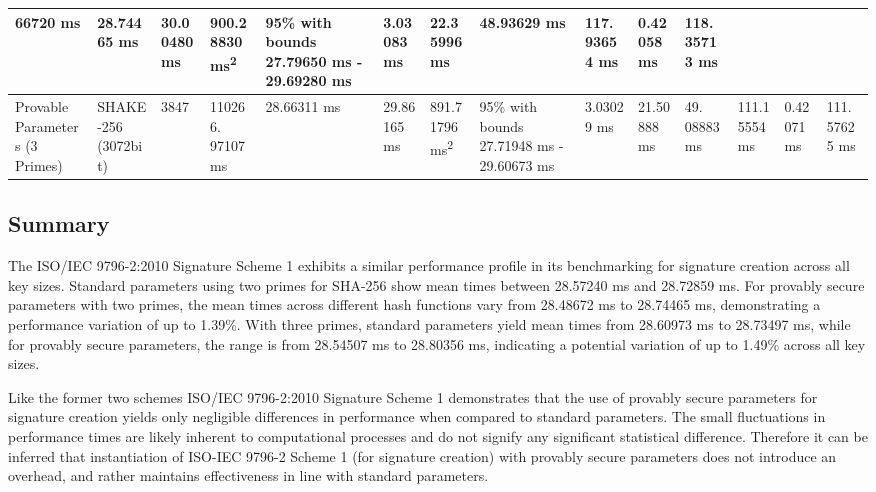 \documentclass[]{final_report}
\theoremstyle{definition}
\begin{document}
\begin{landscape}
\begin{longtable}{|p{2.3cm}|p{1.8cm}|p{1.0cm}|p{1.7cm}|p{1.4cm}|p{1.5cm}|p{1.8cm}|p{1.5cm}|p{1.2cm}|p{1.5cm}|p{1.3cm}|p{1.2cm}|p{1.3cm}|p{1.3cm}|}
66720 ms & 28.74465 ms & 30.00480 ms & 900.28830 ms\textsuperscript{2} & 95\% with bounds 27.79650 ms - 29.69280 ms & 3.03083 ms & 22.35996 ms & 48.93629 ms & 117.
93654 ms & 0.42058 ms & 118.
35713 ms  \\
\hline
Provable Parameters (3 Primes) & SHAKE-256 (3072bit) & 3847 & 110266.
97107 ms & 28.66311 ms & 29.86165 ms & 891.71796 ms\textsuperscript{2} & 95\% with bounds 27.71948 ms - 29.60673 ms & 3.03029 ms & 21.50888 ms & 49.
08883 ms & 111.15554 ms & 0.42071 ms & 111.
57625 ms  \\
\hline


\end{longtable}


\end{landscape}

\subsection*{Summary}

The ISO/IEC 9796-2:2010 Signature Scheme 1 exhibits a similar performance profile in its benchmarking for signature creation across all key sizes. Standard parameters using two primes for SHA-256 show mean times between 28.57240 ms and 28.72859 ms. For provably secure parameters with two primes, the mean times across different hash functions vary from 28.48672 ms to 28.74465 ms, demonstrating a performance variation of up to 1.39\%. With three primes, standard parameters yield mean times from 28.60973 ms to 28.73497 ms, while for provably secure parameters, the range is from 28.54507 ms to 28.80356 ms, indicating a potential variation of up to 1.49\% across all key sizes.


Like the former two schemes ISO/IEC 9796-2:2010 Signature Scheme 1 demonstrates that the use of provably secure parameters for signature creation yields only negligible differences in performance when compared to standard parameters.  The small fluctuations in performance times are likely inherent to computational processes and do not signify any significant statistical difference. Therefore it can be inferred that instantiation of ISO-IEC 9796-2 Scheme 1 (for signature creation) with provably secure parameters does not introduce an overhead, and rather maintains effectiveness in line with standard parameters.
\end{document}
